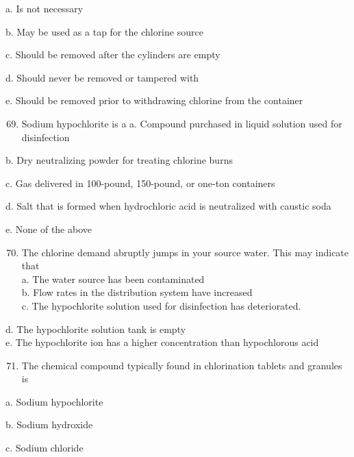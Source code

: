 \documentclass[10pt]{article}
\begin{document}
\begin{enumerate}
\begin{enumerate}
\begin{enumerate}
\end{enumerate}

a. Is not necessary

b. May be used as a tap for the chlorine source

c. Should be removed after the cylinders are empty

d. Should never be removed or tampered with

e. Should be removed prior to withdrawing chlorine from the container

\begin{enumerate}
  \setcounter{enumi}{68}
  \item Sodium hypochlorite is a a. Compound purchased in liquid solution used for disinfection
\end{enumerate}

b. Dry neutralizing powder for treating chlorine burns

c. Gas delivered in 100-pound, 150-pound, or one-ton containers

d. Salt that is formed when hydrochloric acid is neutralized with caustic soda

e. None of the above

\begin{enumerate}
  \setcounter{enumi}{69}
  \item The chlorine demand abruptly jumps in your source water. This may indicate that\\
a. The water source has been contaminated\\
b. Flow rates in the distribution system have increased\\
c. The hypochlorite solution used for disinfection has deteriorated.\\
\end{enumerate}
d. The hypochlorite solution tank is empty\\
e. The hypochlorite ion has a higher concentration than hypochlorous acid\\

\begin{enumerate}
  \setcounter{enumi}{70}
  \item The chemical compound typically found in chlorination tablets and granules is\\
\end{enumerate}

a. Sodium hypochlorite

b. Sodium hydroxide

c. Sodium chloride


\end{enumerate}
\end{enumerate}
\end{document}
